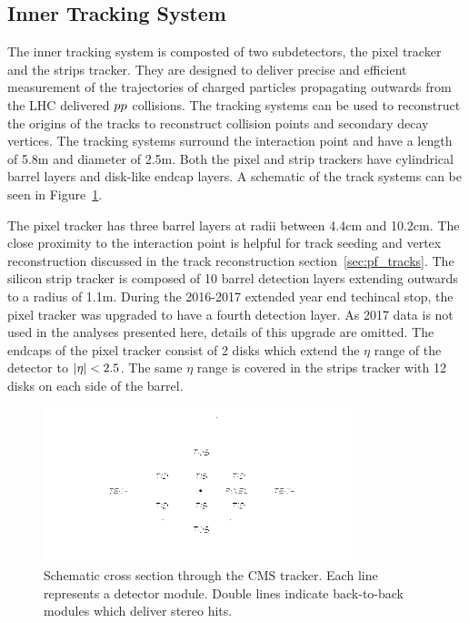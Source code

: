 \subsection{Inner Tracking System}
The inner tracking system is composted of two subdetectors, the pixel tracker and the
strips tracker. They are designed to deliver precise and efficient measurement of
the trajectories of charged particles propagating outwards from the LHC delivered
$pp$ collisions. The tracking systems can be used to reconstruct the origins of
the tracks to reconstruct collision points and secondary decay vertices. The
tracking systems surround the interaction point and have a length of 5.8m and 
diameter of 2.5m. Both the pixel and strip trackers have cylindrical barrel
layers and disk-like endcap layers. A schematic of the track systems
can be seen in Figure~\ref{fig:cms_tracker}.

The pixel tracker has three barrel layers at radii between 4.4cm and 10.2cm. The
close proximity to the interaction point is helpful for track seeding and vertex
reconstruction discussed in the track reconstruction section~\ref{sec:pf_tracks}.
The silicon strip tracker is composed of 10 barrel detection layers extending 
outwards to a radius of 1.1m. During the 2016-2017 extended year end techincal stop,
the pixel tracker was upgraded to have a fourth detection layer. As 2017 data is not used
in the analyses presented here, details of this upgrade are omitted.
The endcaps of the pixel tracker consist of 2 disks which extend the $\eta$ 
range of the detector to $\lvert\eta\rvert < 2.5$. The same $\eta$ range is covered in the
strips tracker with 12 disks on each side of the barrel.

\begin{figure}[htbp]
\centering
     \includegraphics[width=0.8\textwidth]{cms_and_lhc/plots/cms_tracker.png}
     \caption{
Schematic cross section through the CMS tracker. Each line represents a detector module. 
Double lines indicate back-to-back modules which deliver stereo hits.
     }
     \label{fig:cms_tracker}
\end{figure}

